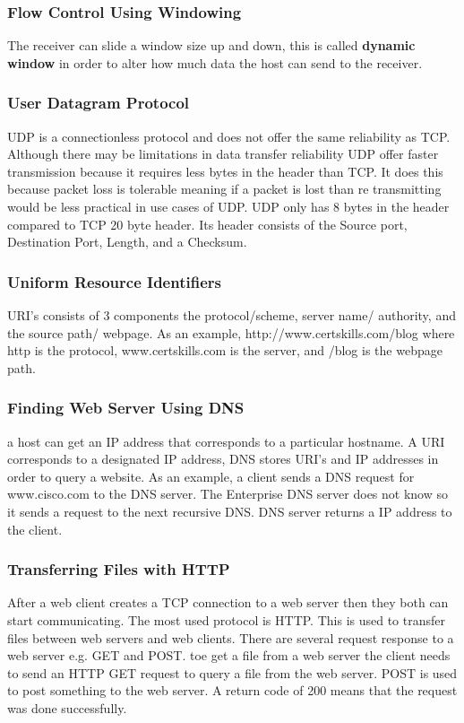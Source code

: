 \documentclass[a4paper]{article}
\begin{document}
    \subsubsection*{Flow Control Using Windowing}
    The receiver can slide a window size up and down, this is called \textbf{dynamic window} in order to alter how much data the host can send to the receiver. 

    \subsubsection{User Datagram Protocol}
    UDP is a connectionless protocol and does not offer the same reliability as TCP. Although there may be limitations in data transfer reliability UDP offer faster transmission because it requires less bytes in the header than TCP. It does this because packet loss is tolerable meaning if a packet is lost than re transmitting would be less practical in use cases of UDP. UDP only has 8 bytes in the header compared to TCP 20 byte header. Its header consists of the Source port, Destination Port, Length, and a Checksum. 

    \subsubsection{Uniform Resource Identifiers} 
    URI's consists of 3 components the protocol/scheme, server name/ authority, and the source path/ webpage. As an example, http://www.certskills.com/blog where http is the protocol, www.certskills.com is the server, and /blog is the webpage path. 

    \subsubsection{Finding Web Server Using DNS}
    a host can get an IP address that corresponds to a particular hostname. A URI corresponds to a designated IP address, DNS stores URI's and IP addresses in order to query a website. As an example, a client sends a DNS request for www.cisco.com to the DNS server. The Enterprise DNS server does not know so it sends a request to the next recursive DNS. DNS server returns a IP address to the client. 

    \subsubsection{Transferring Files with HTTP}
    After a web client creates a TCP connection to a web server then they both can start communicating. The most used protocol is HTTP. This is used to transfer files between web servers and web clients. There are several request response to a web server e.g. GET and POST. toe get a file from a web server the client needs to send an HTTP GET request to query a file from the web server. POST is used to post something to the web server. A return code of 200 means that the request was done successfully. 
\end{document}
